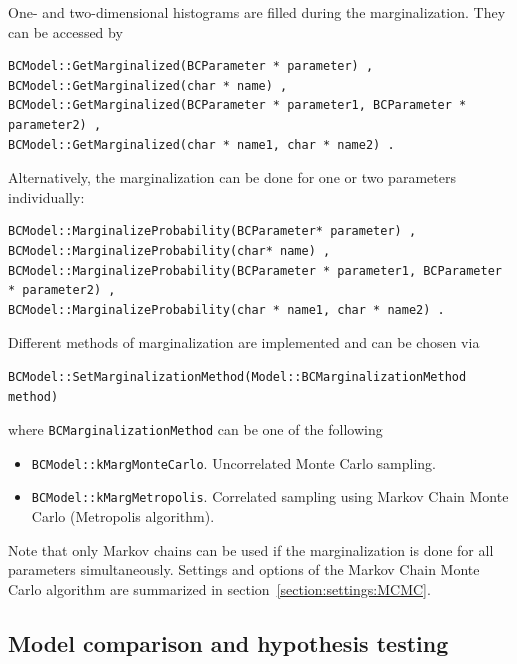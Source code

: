 \documentclass[11pt, a4paper]{article}
\begin{document}
\noindent
One- and two-dimensional histograms are filled during the
marginalization. They can be accessed by
%
\begin{verbatim}
BCModel::GetMarginalized(BCParameter * parameter) ,
BCModel::GetMarginalized(char * name) ,
BCModel::GetMarginalized(BCParameter * parameter1, BCParameter * parameter2) ,
BCModel::GetMarginalized(char * name1, char * name2) .
\end{verbatim}

\noindent
Alternatively, the marginalization can be done for one or two
parameters individually:
%
\begin{verbatim}
BCModel::MarginalizeProbability(BCParameter* parameter) ,
BCModel::MarginalizeProbability(char* name) ,
BCModel::MarginalizeProbability(BCParameter * parameter1, BCParameter * parameter2) ,
BCModel::MarginalizeProbability(char * name1, char * name2) .
\end{verbatim}

\noindent
Different methods of marginalization are implemented and can be chosen
via
%
\begin{verbatim}
BCModel::SetMarginalizationMethod(Model::BCMarginalizationMethod method)
\end{verbatim}

\noindent
where \verb|BCMarginalizationMethod| can be one of the following
%
\begin{itemize}
\item \verb|BCModel::kMargMonteCarlo|. Uncorrelated Monte Carlo sampling.
\item \verb|BCModel::kMargMetropolis|. Correlated sampling using
  Markov Chain Monte Carlo (Metropolis algorithm).
\end{itemize}

\noindent
Note that only Markov chains can be used if the marginalization is
done for all parameters simultaneously. Settings and options of the
Markov Chain Monte Carlo algorithm are summarized in
section~\ref{section:settings:MCMC}. \\


\subsection{Model comparison and hypothesis testing}

\end{document}
